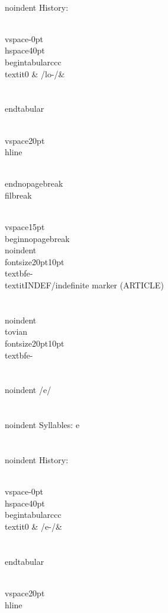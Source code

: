 \\noindent History:

\\vspace{-0pt}
\\hspace{40pt}
\\begin{tabular}{ccc}
\\textit{0} & /lo-/& \\\\
\\end{tabular}

\\vspace{20pt}\\hline

\\end{nopagebreak}
\\filbreak



\\vspace{15pt}
\\begin{nopagebreak}
\\noindent{\\fontsize{20pt}{10pt}\\textbf{e-} } \\textit{INDEF/indefinite marker} (ARTICLE)\\\\
\\noindent {\\tovian \\fontsize{20pt}{10pt} \\textbf{e-} }\\\\
\\noindent /{\textprimstress}e/\\\\
\\noindent Syllables: e\\\\


\\noindent History:

\\vspace{-0pt}
\\hspace{40pt}
\\begin{tabular}{ccc}
\\textit{0} & /e-/& \\\\
\\end{tabular}

\\vspace{20pt}\\hline


